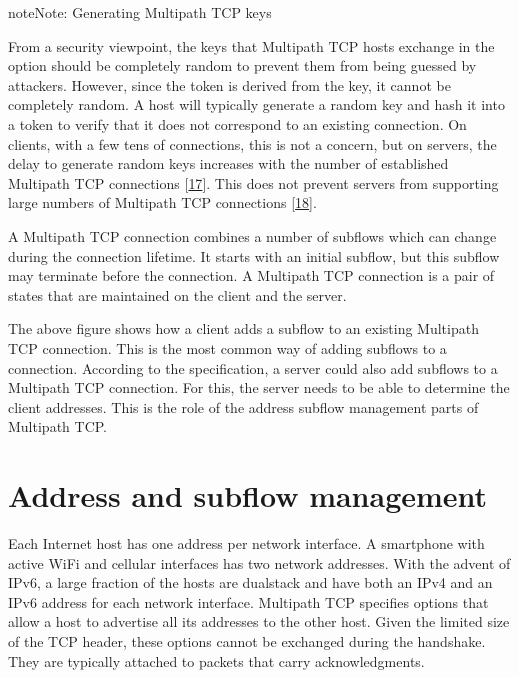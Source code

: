 \documentclass[letterpaper,10pt,english]{sphinxmanual}
\begin{document}
\begin{sphinxadmonition}{note}{Note:}
\sphinxAtStartPar
Generating Multipath TCP keys

\sphinxAtStartPar
From a security viewpoint, the keys that Multipath TCP hosts exchange in the  option should be completely random to prevent them from being guessed by attackers. However, since the token is derived from the key, it cannot be completely random. A host will typically generate a random key and hash it into a token to verify that it does not correspond to an existing connection. On clients, with a few tens of connections, this is not a concern, but on servers, the delay to generate random keys increases with the number of established Multipath TCP connections {[}\hyperlink{cite.biblio:id8941}{17}{]}. This does not prevent servers from supporting large numbers of Multipath TCP connections {[}\hyperlink{cite.biblio:id9001}{18}{]}.
\end{sphinxadmonition}

\sphinxAtStartPar
A Multipath TCP connection combines a number of subflows which can change during the connection lifetime. It starts with an initial subflow, but this subflow may terminate before the connection. A Multipath TCP connection is a pair of states that are maintained on the client and the server.

\sphinxAtStartPar
The above figure shows how a client adds a subflow to an existing Multipath TCP connection. This is the most common way of adding subflows to a connection. According to the specification, a server could also add subflows to a Multipath TCP connection. For this, the server needs to be able to determine the client addresses. This is the role of the address subflow management parts of Multipath TCP.


\section{Address and subflow management}
\label{\detokenize{mptcp:address-and-subflow-management}}\label{\detokenize{mptcp:mptcp-addr-management}}
\sphinxAtStartPar
Each Internet host has one address per network interface. A smartphone with active Wi\sphinxhyphen{}Fi and cellular interfaces has two network addresses. With the advent of IPv6, a large fraction of the hosts are dual\sphinxhyphen{}stack and have both an IPv4 and an IPv6 address for each network interface. Multipath TCP specifies options that allow a host to advertise all its addresses to the other host. Given the limited size of the TCP header, these options cannot be exchanged during the handshake. They are typically attached to packets that carry acknowledgments.
\end{document}
